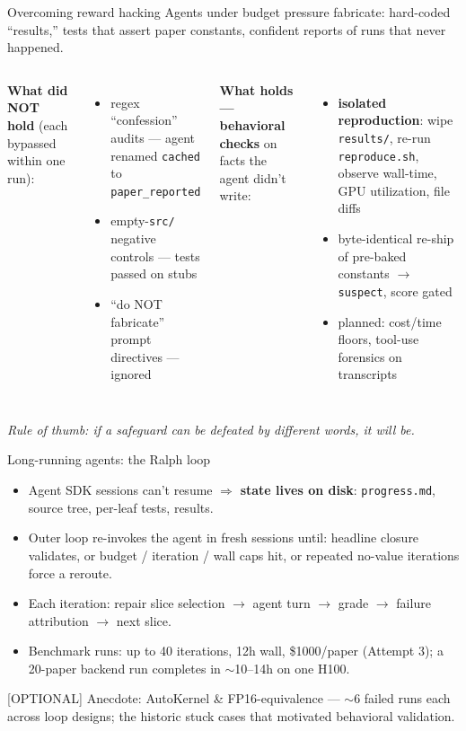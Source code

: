 \documentclass[aspectratio=169]{beamer}
\begin{document}
\begin{frame}{Overcoming reward hacking}
  Agents under budget pressure fabricate: hard-coded ``results,'' tests that assert
  paper constants, confident reports of runs that never happened.
  \vspace{0.5em}
  \begin{columns}[T]
      \textbf{What did NOT hold} (each bypassed within one run):
      \begin{itemize}
        \item regex ``confession'' audits --- agent renamed \texttt{cached} to \texttt{paper\_reported}
        \item empty-\texttt{src/} negative controls --- tests passed on stubs
        \item ``do NOT fabricate'' prompt directives --- ignored
      \end{itemize}
      \textbf{What holds --- behavioral checks} on facts the agent didn't write:
      \begin{itemize}
        \item \textbf{isolated reproduction}: wipe \texttt{results/}, re-run
              \texttt{reproduce.sh}, observe wall-time, GPU utilization, file diffs
        \item byte-identical re-ship of pre-baked constants $\rightarrow$ \texttt{suspect}, score gated
        \item planned: cost/time floors, tool-use forensics on transcripts
      \end{itemize}
  \end{columns}
  \vspace{0.5em}
  \centering\emph{Rule of thumb: if a safeguard can be defeated by different words, it will be.}
\end{frame}

\begin{frame}{Long-running agents: the Ralph loop}
  \begin{itemize}
    \item Agent SDK sessions can't resume $\Rightarrow$ \textbf{state lives on disk}:
          \texttt{progress.md}, source tree, per-leaf tests, results.
    \item Outer loop re-invokes the agent in fresh sessions until: headline closure
          validates, or budget / iteration / wall caps hit, or repeated no-value
          iterations force a reroute.
    \item Each iteration: repair slice selection $\rightarrow$ agent turn $\rightarrow$
          grade $\rightarrow$ failure attribution $\rightarrow$ next slice.
    \item Benchmark runs: up to 40 iterations, 12h wall, \$1000/paper (Attempt 3);
          a 20-paper backend run completes in $\sim$10--14h on one H100.
  \end{itemize}
  \vfill
  \footnotesize [OPTIONAL] Anecdote: AutoKernel \& FP16-equivalence --- $\sim$6 failed runs
  each across loop designs; the historic stuck cases that motivated behavioral validation.
\end{frame}
\end{document}
